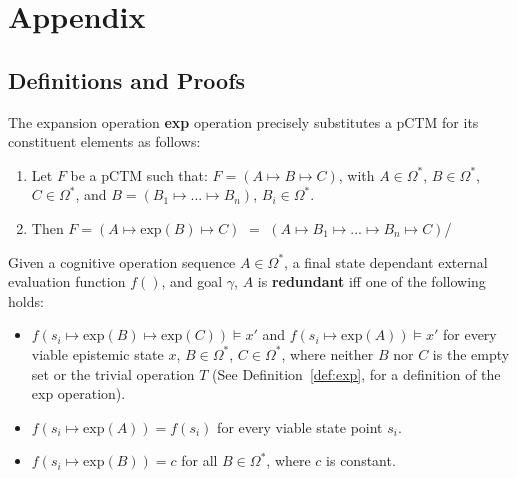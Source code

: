 \chapter*{Appendix} \label{chp:appendix}
\section*{Definitions and Proofs}
\begin{definition} \label{def:exp}
The expansion operation \textbf{exp} operation precisely substitutes a pCTM for its constituent elements as follows: 
\begin{enumerate}
\item Let $F$ be a pCTM such that: $F=(A \longmapsto B \longmapsto C)$, with $A \in \Omega^*$, $B \in \Omega^*$, $C \in \Omega^*$, and $B = (B_1 \longmapsto ... \longmapsto B_n)$, $B_i \in \Omega^*$. 
\item Then $F=(A \longmapsto \text{exp}(B) \longmapsto C)$ $=$ $(A \longmapsto B_1 \longmapsto ... \longmapsto B_n \longmapsto C)$/
\end{enumerate}
\end{definition}

\begin{definition} \label{lem:uniredundant}
Given a cognitive operation sequence $A \in \Omega^*$, a final state dependant external evaluation function $f()$, and goal $\gamma$, $A$ is \textbf{redundant} iff one of the following holds:
\begin{itemize}
\item $f(s_i \longmapsto \text{exp}(B) \longmapsto \text{exp}(C)) \models x'$ and $f(s_i \longmapsto \text{exp}(A)) \models x'$ for every viable epistemic state $x$, $B \in \Omega^*$, $C \in \Omega^*$, where neither $B$ nor $C$ is the empty set or the trivial operation $T$ (See Definition~\ref{def:exp}, for a definition of the exp operation). 
\item $f(s_i \longmapsto \text{exp}(A)) = f(s_i)$ for every viable state point $s_i$.
\item $f(s_i \longmapsto \text{exp}(B))=c$ for all $B \in \Omega^*$, where $c$ is constant.
\end{itemize}
\end{definition}

